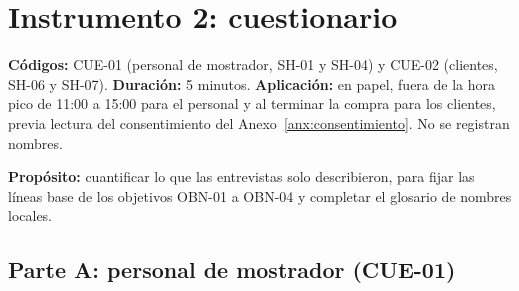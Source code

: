 \section{Instrumento 2: cuestionario}\label{anx:cuestionario}

\textbf{Códigos:} CUE-01 (personal de mostrador, SH-01 y SH-04) y CUE-02 (clientes, SH-06 y SH-07). \textbf{Duración:} 5 minutos. \textbf{Aplicación:} en papel, fuera de la hora pico de 11:00 a 15:00 para el personal y al terminar la compra para los clientes, previa lectura del consentimiento del Anexo~\ref{anx:consentimiento}. No se registran nombres.

\textbf{Propósito:} cuantificar lo que las entrevistas solo describieron, para fijar las líneas base de los objetivos OBN-01 a OBN-04 y completar el glosario de nombres locales.

\subsection*{Parte A: personal de mostrador (CUE-01)}


